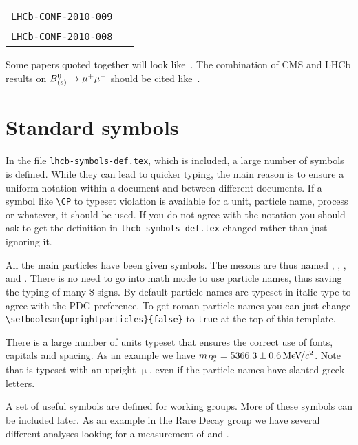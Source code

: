 \begin{center}
\begin{longtable}{ll}
\texttt{LHCb-CONF-2010-009}~\cite{LHCb-CONF-2010-009} \\
\texttt{LHCb-CONF-2010-008}~\cite{LHCb-CONF-2010-008} & \\
\hline
\end{longtable}
\end{center}

Some \lhcb papers quoted together will look
like~\cite{LHCb-PAPER-2011-007,LHCb-PAPER-2011-006,
  LHCb-PAPER-2011-005,LHCb-PAPER-2011-004,LHCb-PAPER-2011-003}.
The combination of CMS and LHCb results on $B^0_{(s)} \rightarrow {\ensuremath{\mu^+\mu^-}}$ should be cited like~\cite{LHCb-CONF-2013-012}.

\section{Standard symbols}

In the file \texttt{lhcb-symbols-def.tex}, which is included, a
large number of symbols is defined. While they can lead to quicker
typing, the main reason is to ensure a uniform notation within a
document and between different \lhcb documents. If a symbol
like \texttt{\textbackslash CP} to typeset \CP violation is available
for a unit, particle name, process or whatever, it should be used.  If
you do not agree with the notation you should ask to get the
definition in \texttt{lhcb-symbols-def.tex} changed rather than just
ignoring it.

All the main particles have been given symbols. The \B mesons are thus
named \Bp, \Bd, \Bs, and \Bc. There is no need to go into math mode to
use particle names, thus saving the typing of many \$ signs. By
default particle names are typeset in italic type to agree with the
PDG preference. To get roman particle
names you can just change 
\texttt{\textbackslash setboolean\{uprightparticles\}\{false\}}
to \texttt{true} at the top of this template.

There is a large number of units typeset that ensures the correct use
of fonts, capitals and spacing. As an example we have
${m_{{{B}^0_{s}}}}=5366.3\pm0.6{\mathrm{\,Me\kern -0.1em V\!/}c^2}$. Note that \mum is typeset with an upright
$\upmu$, even if the particle names have slanted greek letters.

A set of useful symbols are defined for working groups. More of these
symbols can be included later. As an example in the Rare Decay group
we have several different analyses looking for a measurement of
 and .
